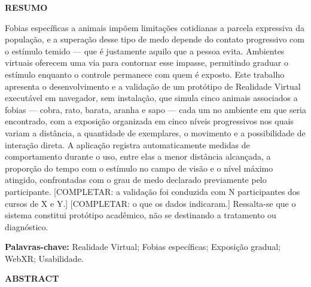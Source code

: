 \begingroup
\begin{center}{\bfseries RESUMO}\end{center}
\vspace{0.3cm}


\noindent Fobias específicas a animais impõem limitações cotidianas a
parcela expressiva da população, e a superação desse tipo de medo depende
do contato progressivo com o estímulo temido --- que é justamente aquilo
que a pessoa evita. Ambientes virtuais oferecem uma via para contornar
esse impasse, permitindo graduar o estímulo enquanto o controle permanece
com quem é exposto. Este trabalho apresenta o desenvolvimento e a
validação de um protótipo de Realidade Virtual executável em navegador,
sem instalação, que simula cinco animais associados a fobias --- cobra,
rato, barata, aranha e sapo --- cada um no ambiente em que seria
encontrado, com a exposição organizada em cinco níveis progressivos nos
quais variam a distância, a quantidade de exemplares, o movimento e a
possibilidade de interação direta. A aplicação registra automaticamente
medidas de comportamento durante o uso, entre elas a menor distância
alcançada, a proporção do tempo com o estímulo no campo de visão e o
nível máximo atingido, confrontadas com o grau de medo declarado
previamente pelo participante. [COMPLETAR: a validação foi conduzida
com N participantes dos cursos de X e Y.] [COMPLETAR: o que os dados
indicaram.] Ressalta-se que o sistema constitui protótipo acadêmico, não
se destinando a tratamento ou diagnóstico.

\vspace{0.4cm}
\noindent\textbf{Palavras-chave:} Realidade Virtual; Fobias específicas;
Exposição gradual; WebXR; Usabilidade.

\vspace{1.0cm}
\begin{center}{\bfseries ABSTRACT}\end{center}
\vspace{0.3cm}

